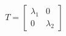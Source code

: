\documentclass[preview]{standalone}
\begin{document}
\begin{align*}
T = \begin{bmatrix} \lambda_1 & 0 \\ 0 & \lambda_2 \end{bmatrix}
\end{align*}
\end{document}
